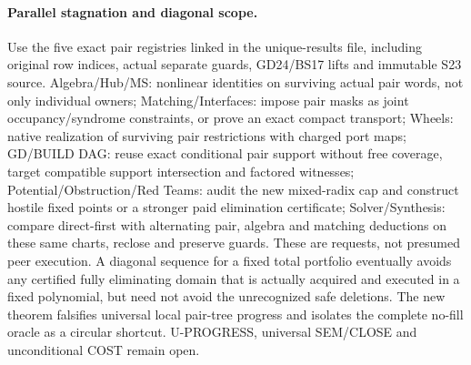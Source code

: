 \documentclass[11pt]{article}
\begin{document}
\paragraph{Parallel stagnation and diagonal scope.}
Use the five exact pair registries linked in the unique-results file, including original row indices, actual separate guards, GD24/BS17 lifts and immutable S23 source. Algebra/Hub/MS: nonlinear identities on surviving actual pair words, not only individual owners; Matching/Interfaces: impose pair masks as joint occupancy/syndrome constraints, or prove an exact compact transport; Wheels: native realization of surviving pair restrictions with charged port maps; GD/BUILD DAG: reuse exact conditional pair support without free coverage, target compatible support intersection and factored witnesses; Potential/Obstruction/Red Teams: audit the new mixed-radix cap and construct hostile fixed points or a stronger paid elimination certificate; Solver/Synthesis: compare direct-first with alternating pair, algebra and matching deductions on these same charts, reclose and preserve guards. These are requests, not presumed peer execution. A diagonal sequence for a fixed total portfolio eventually avoids any certified fully eliminating domain that is actually acquired and executed in a fixed polynomial, but need not avoid the unrecognized safe deletions. The new theorem falsifies universal local pair-tree progress and isolates the complete no-fill oracle as a circular shortcut. U-PROGRESS, universal SEM/CLOSE and unconditional COST remain open.
\end{document}
